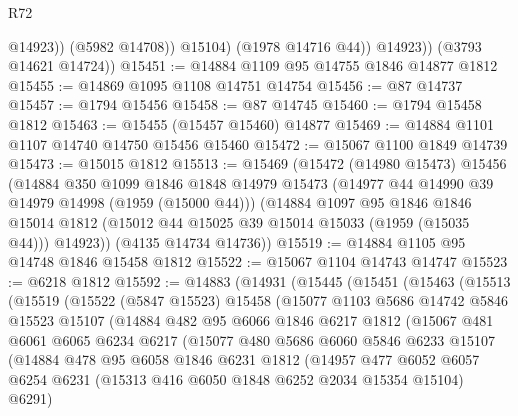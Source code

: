 \begin{lexlean}{R72}
\begin{coremodule}
                    @14923))
                (@5982 @14708))
              @15104)
            (@1978 @14716 @44))
          @14923))
      (@3793 @14621 @14724))
@15451 := @14884 @1109 @95 @14755 @1846 @14877 @1812
@15455 := @14869 @1095 @1108 @14751 @14754
@15456 := @87 @14737
@15457 := @1794 @15456
@15458 := @87 @14745
@15460 := @1794 @15458 @1812
@15463 := @15455 (@15457 @15460) @14877
@15469 := @14884 @1101 @1107 @14740 @14750 @15456 @15460
@15472 := @15067 @1100 @1849 @14739
@15473 := @15015 @1812
@15513 := @15469
    (@15472
      (@14980 @15473)
      @15456
      (@14884
        @350
        @1099
        @1846
        @1848
        @14979
        @15473
        (@14977 @44 @14990 @39 @14979 @14998 (@1959 (@15000 @44)))
        (@14884
          @1097
          @95
          @1846
          @1846
          @15014
          @1812
          (@15012 @44 @15025 @39 @15014 @15033 (@1959 (@15035 @44)))
          @14923))
      (@4135 @14734 @14736))
@15519 := @14884 @1105 @95 @14748 @1846 @15458 @1812
@15522 := @15067 @1104 @14743 @14747
@15523 := @6218 @1812
@15592 := @14883
    (@14931
      (@15445
        (@15451
          (@15463
            (@15513
              (@15519
                (@15522
                  (@5847 @15523)
                  @15458
                  (@15077
                    @1103
                    @5686
                    @14742
                    @5846
                    @15523
                    @15107
                    (@14884
                      @482
                      @95
                      @6066
                      @1846
                      @6217
                      @1812
                      (@15067
                        @481
                        @6061
                        @6065
                        @6234
                        @6217
                        (@15077
                          @480
                          @5686
                          @6060
                          @5846
                          @6233
                          @15107
                          (@14884
                            @478
                            @95
                            @6058
                            @1846
                            @6231
                            @1812
                            (@14957
                              @477
                              @6052
                              @6057
                              @6254
                              @6231
                              (@15313 @416 @6050 @1848 @6252 @2034 @15354 @15104)
                              @6291)

\end{coremodule}
\end{lexlean}
